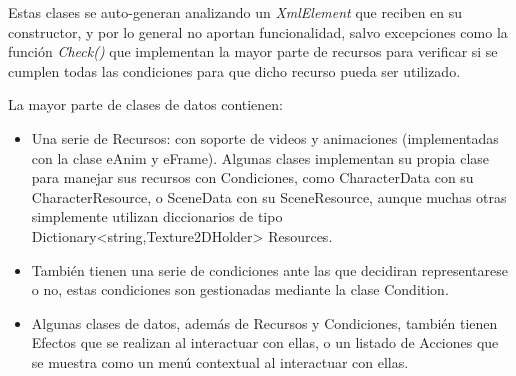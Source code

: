 Estas clases se auto-generan analizando un \textit{XmlElement} que reciben en su constructor, y por lo general no aportan funcionalidad, salvo excepciones como la función \textit{Check()} que implementan la mayor parte de recursos para verificar si se cumplen todas las condiciones para que dicho recurso pueda ser utilizado.

La mayor parte de clases de datos contienen:
\begin{itemize}
	\item Una serie de Recursos: con soporte de videos y animaciones (implementadas con la clase eAnim y eFrame). Algunas clases implementan su propia clase para manejar sus recursos con Condiciones, como CharacterData con su CharacterResource, o SceneData con su SceneResource, aunque muchas otras simplemente utilizan diccionarios de tipo Dictionary<string,Texture2DHolder> Resources.
	
	\item También tienen una serie de condiciones ante las que decidiran representarese o no, estas condiciones son gestionadas mediante la clase Condition.
	
	\item Algunas clases de datos, además de Recursos y Condiciones, también tienen Efectos que se realizan al interactuar con ellas, o un listado de Acciones que se muestra como un menú contextual al interactuar con ellas.
\end{itemize}


